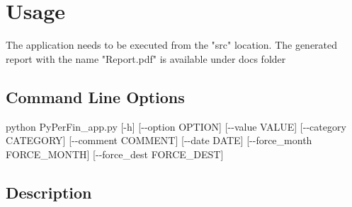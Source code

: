\documentclass[a4paper,11pt]{book}
\begin{document}
\chapter{Usage}
The application needs to be executed from the "src" location. The generated report with the name "Report.pdf" is available under docs folder

\section{Command Line Options}

python PyPerFin_app.py [-h] [\--\--option OPTION] [\--\--value VALUE] 
                            [\--\--category CATEGORY] [\--\--comment COMMENT]
                            [\--\--date DATE] [\--\--force\_month FORCE\_MONTH]
                            [\--\--force\_dest FORCE\_DEST]

\section{Description}
 
\end{document}
